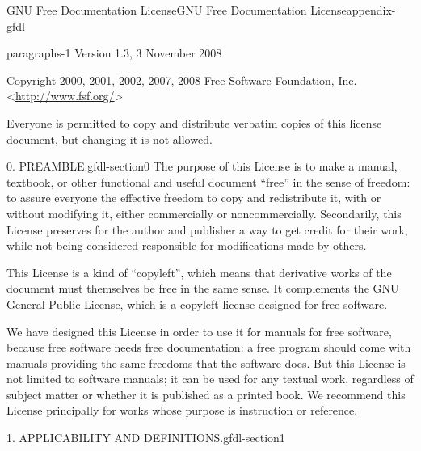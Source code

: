 \documentclass[oneside,10pt,]{book}
\numberwithin{equation}{section}
\begin{document}
%
%
%
%
\typeout{************************************************}
\typeout{************************************************}
%
%
\appendix
%
\begin{appendixptx}{GNU Free Documentation License}{}{GNU Free Documentation License}{}{}{appendix-gfdl}
\begin{paragraphs}{}{paragraphs-1}%
\hypertarget{p-1555}{}%
Version 1.3, 3 November 2008%
\par
\hypertarget{p-1556}{}%
Copyright \textcopyright{} 2000, 2001, 2002, 2007, 2008 Free Software Foundation, Inc. \textless{}\url{http://www.fsf.org/}\textgreater{}%
\par
\hypertarget{p-1557}{}%
Everyone is permitted to copy and distribute verbatim copies of this license document, but changing it is not allowed.%
\end{paragraphs}%
\begin{paragraphs}{0. PREAMBLE.}{gfdl-section0}%
\hypertarget{p-1558}{}%
The purpose of this License is to make a manual, textbook, or other functional and useful document ``free'' in the sense of freedom: to assure everyone the effective freedom to copy and redistribute it, with or without modifying it, either commercially or noncommercially. Secondarily, this License preserves for the author and publisher a way to get credit for their work, while not being considered responsible for modifications made by others.%
\par
\hypertarget{p-1559}{}%
This License is a kind of ``copyleft'', which means that derivative works of the document must themselves be free in the same sense. It complements the GNU General Public License, which is a copyleft license designed for free software.%
\par
\hypertarget{p-1560}{}%
We have designed this License in order to use it for manuals for free software, because free software needs free documentation: a free program should come with manuals providing the same freedoms that the software does. But this License is not limited to software manuals; it can be used for any textual work, regardless of subject matter or whether it is published as a printed book. We recommend this License principally for works whose purpose is instruction or reference.%
\end{paragraphs}%
\begin{paragraphs}{1. APPLICABILITY AND DEFINITIONS.}{gfdl-section1}%

\end{paragraphs}
\end{appendixptx}
\end{document}
